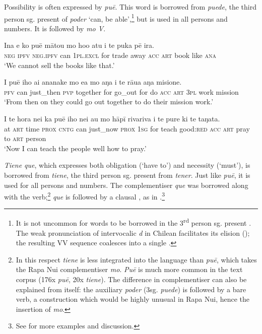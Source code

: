 Possibility is often expressed by \textit{puē}. This word is borrowed from  \textit{puede}, the third person sg. present  of \textit{poder} ‘can, be able’,\footnote{\label{fn:508}It is not uncommon for  words to be borrowed in the 3\textsuperscript{rd} person sg. present \citep[197]{Makihara2001Adaptation}. The weak pronunciation of intervocalic \textit{d} in Chilean  facilitates its elision (); the resulting VV sequence coalesces into a single .} but is used in all persons and numbers. It is followed by \textit{mo V}.

\ea\label{ex:11.82}
\gll {\ꞌ}Ina e ko puē mātou mo ho{\ꞌ}o atu i te puka pē ira.  \\
\textsc{neg} \textsc{ipfv} \textsc{neg.ipfv} can \textsc{1pl.excl} for trade away \textsc{acc} \textsc{art} book like \textsc{ana}  \\

\glt 
‘We cannot sell the books like that.’ \textstyleExampleref{[R206.021]} 
\z

\ea\label{ex:11.83}
\gll I puē iho ai ananake mo e{\ꞌ}a mo aŋa i te rāua aŋa misione. \\
\textsc{pfv} can just\_then \textsc{pvp} together for go\_out for do \textsc{acc} \textsc{art} \textsc{3pl} work mission \\

\glt 
‘From then on they could go out together to do their mission work.’ \textstyleExampleref{[R231.281]} 
\z

\ea\label{ex:11.84}
\gll {\ꞌ}I te hora nei ka puē iho nei au mo hāpī rivariva i te pure  ki te taŋata.\\
at \textsc{art} time \textsc{prox} \textsc{cntg} can just\_now \textsc{prox} \textsc{1sg} for teach good:\textsc{red} \textsc{acc} \textsc{art} pray  to \textsc{art} person\\

\glt 
‘Now I can teach the people well how to pray.’ \textstyleExampleref{[R231.195]} 
\z

\textit{Tiene que}, which expresses both obligation (‘have to’) and necessity (‘must’), is borrowed from  \textit{tiene}, the third person sg. present from \textit{tener}. Just like \textit{puē}, it is used for all persons and numbers. The complementiser \textit{que} was borrowed along with the verb;\footnote{\label{fn:509}In this respect \textit{tiene} is less integrated into the language than \textit{puē}, which takes the Rapa Nui complementiser \textit{mo}. \textit{Puē} is much more common in the text corpus (176x \textit{puē}, 20x \textit{tiene}). The difference in complementiser can also be explained from  itself: the auxiliary \textit{poder} (3sg. \textit{puede}) is followed by a bare verb, a construction which would be highly unusual in Rapa Nui, hence the insertion of \textit{mo}.} \textit{que} is followed by a clausal , as in .\footnote{\label{fn:510}See \citet[207–210]{Makihara2001Adaptation} for more examples and discussion.}

